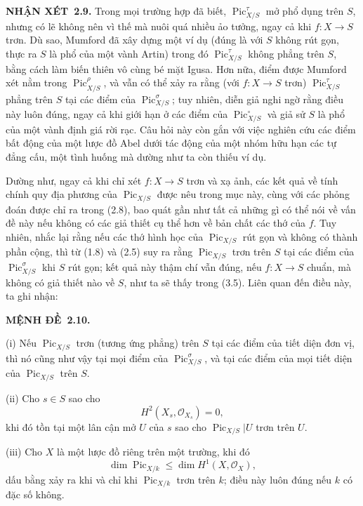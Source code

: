 \documentclass[11pt,twoside,openany]{book}
\numberwithin{equation}{section}
\newcommand{\src}[1]{%
  \phantomsection\hypertarget{src:\fgasourceid:#1}{}%
  \marginpar{\raggedleft\footnotesize\sffamily #1}%
}
\newcommand{\fgasourceid}{unset}
\newcommand{\result}[2]{\par\medskip\noindent\textbf{#1\if\relax\detokenize{#2}\relax\else\ #2\fi.}\quad}
\begin{document}
\result{NHẬN XÉT}{2.9} Trong mọi trường hợp đã biết,
$\operatorname{Pic}_{X/S}^\tau$ mở phổ dụng trên $S$, nhưng có lẽ không nên vì
thế mà nuôi quá nhiều ảo tưởng, ngay cả khi $f:X\longrightarrow S$ trơn. Dù
sao, Mumford đã xây dựng một ví dụ (đúng là với $S$ không rút gọn, thực ra $S$
là phổ của một vành Artin) trong đó $\operatorname{Pic}_{X/S}^\tau$ không
phẳng trên $S$, bằng cách làm biến thiên vô cùng bé mặt Igusa. Hơn nữa, điểm
được Mumford xét nằm trong $\operatorname{Pic}_{X/S}^\rho$, và vẫn có thể xảy
ra rằng (với $f:X\longrightarrow S$ trơn) $\operatorname{Pic}_{X/S}^\tau$
phẳng trên $S$ tại các điểm của $\operatorname{Pic}_{X/S}^\sigma$; tuy nhiên,
diễn giả nghi ngờ rằng điều này luôn đúng, ngay cả khi giới hạn ở các điểm của
$\operatorname{Pic}_{X/S}^\circ$ và giả sử $S$ là phổ của một vành định giá
rời rạc. Câu hỏi này còn gắn với việc nghiên cứu các điểm bất động của một
lược đồ Abel dưới tác động của một nhóm hữu hạn các tự đẳng cấu, một tình
huống mà dường như ta còn thiếu ví dụ.

Dường như, ngay cả khi chỉ xét $f:X\longrightarrow S$ trơn và xạ ảnh, các kết
quả về tính chính quy địa phương của $\operatorname{Pic}_{X/S}$ được nêu trong
mục này, cùng với các phỏng đoán được chỉ ra trong (2.8), bao quát gần như tất
cả những gì có thể nói về vấn đề này nếu không có các giả thiết cụ thể hơn về bản chất
các thớ của $f$. Tuy nhiên, nhắc lại rằng nếu các thớ hình học của
$\operatorname{Pic}_{X/S}$ rút gọn và không có thành phần cộng, thì từ (1.8)
và (2.5) suy ra rằng $\operatorname{Pic}_{X/S}$ trơn trên $S$ tại các điểm của
$\operatorname{Pic}_{X/S}^\sigma$ khi $S$ rút gọn; kết quả này thậm chí vẫn
đúng, nếu $f:X\longrightarrow S$ chuẩn, mà không có giả thiết nào về $S$, như
ta sẽ thấy trong (3.5). Liên quan đến điều này, ta ghi nhận:

\result{MỆNH ĐỀ}{2.10}

\noindent(i) Nếu $\operatorname{Pic}_{X/S}$ trơn (tương ứng phẳng) trên $S$
tại các điểm của tiết diện đơn vị, thì nó cũng như vậy tại mọi điểm của
$\operatorname{Pic}_{X/S}^\sigma$, và tại các điểm của mọi tiết diện của
$\operatorname{Pic}_{X/S}$ trên $S$.
\src{236}
\noindent(ii) Cho $s\in S$ sao cho
\[
H^2(X_s,\mathcal O_{X_s})=0,
\]
khi đó tồn tại một lân cận mở $U$ của $s$ sao cho
$\operatorname{Pic}_{X/S}|U$ trơn trên $U$.

\noindent(iii) Cho $X$ là một lược đồ riêng trên một trường, khi đó
\[
\dim\operatorname{Pic}_{X/k}\leq\dim H^1(X,\mathcal O_X),
\]
dấu bằng xảy ra khi và chỉ khi $\operatorname{Pic}_{X/k}$ trơn trên $k$; điều
này luôn đúng nếu $k$ có đặc số không.
\end{document}
